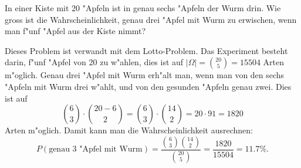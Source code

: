 In einer Kiste mit 20 "Apfeln ist in genau sechs "Apfeln der Wurm drin.
Wie gross ist die Wahrscheinlichkeit, genau drei "Apfel mit Wurm zu
erwischen, wenn man f"unf "Apfel aus der Kiste nimmt?

\begin{loesung}
Dieses Problem ist verwandt mit dem Lotto-Problem.
Das Experiment besteht darin, f"unf "Apfel von 20 zu w"ahlen, dies ist auf
$|\Omega|=\binom{20}{5}=15504$ Arten m"oglich.
Genau drei "Apfel mit Wurm erh"alt man, wenn man von den sechs "Apfeln mit
Wurm drei w"ahlt, und von den gesunden "Apfeln genau zwei. Dies ist auf
\[
\binom{6}{3}\cdot\binom{20-6}{2}
=
\binom{6}{3}\cdot\binom{14}{2}
=
20\cdot 91=1820
\]
Arten m"oglich. Damit kann man die Wahrscheinlichkeit ausrechnen:
\[
P(\text{genau 3 "Apfel mit Wurm})=\frac{\binom{6}{3}\binom{14}{2}}{\binom{20}{5}}
=\frac{1820}{15504}=11.7\%.
\]
\end{loesung}

